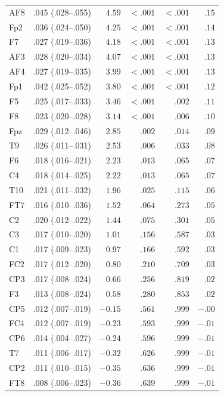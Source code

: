 {\begin{longtable}{llrrrr}
AF8 & .045 (.028--.055) & $4.59$ & $< .001$ & $< .001$ & $.15$ \\
Fp2 & .036 (.024--.050) & $4.25$ & $< .001$ & $< .001$ & $.14$ \\
F7 & .027 (.019--.036) & $4.18$ & $< .001$ & $< .001$ & $.13$ \\
AF3 & .028 (.020--.034) & $4.07$ & $< .001$ & $< .001$ & $.13$ \\
AF4 & .027 (.019--.035) & $3.99$ & $< .001$ & $< .001$ & $.13$ \\
Fp1 & .042 (.025--.052) & $3.80$ & $< .001$ & $< .001$ & $.12$ \\
F5 & .025 (.017--.033) & $3.46$ & $< .001$ & $.002$ & $.11$ \\
F8 & .023 (.020--.028) & $3.14$ & $< .001$ & $.006$ & $.10$ \\
Fpz & .029 (.012--.046) & $2.85$ & $.002$ & $.014$ & $.09$ \\
T9 & .026 (.011--.031) & $2.53$ & $.006$ & $.033$ & $.08$ \\
F6 & .018 (.016--.021) & $2.23$ & $.013$ & $.065$ & $.07$ \\
C4 & .018 (.014--.025) & $2.22$ & $.013$ & $.065$ & $.07$ \\
T10 & .021 (.011--.032) & $1.96$ & $.025$ & $.115$ & $.06$ \\
FT7 & .016 (.010--.036) & $1.52$ & $.064$ & $.273$ & $.05$ \\
C2 & .020 (.012--.022) & $1.44$ & $.075$ & $.301$ & $.05$ \\
C3 & .017 (.010--.020) & $1.01$ & $.156$ & $.587$ & $.03$ \\
C1 & .017 (.009--.023) & $0.97$ & $.166$ & $.592$ & $.03$ \\
FC2 & .017 (.012--.020) & $0.80$ & $.210$ & $.709$ & $.03$ \\
CP3 & .017 (.008--.024) & $0.66$ & $.256$ & $.819$ & $.02$ \\
F3 & .013 (.008--.024) & $0.58$ & $.280$ & $.853$ & $.02$ \\
CP5 & .012 (.007--.019) & $-0.15$ & $.561$ & $.999$ & $-.00$ \\
FC4 & .012 (.007--.019) & $-0.23$ & $.593$ & $.999$ & $-.01$ \\
CP6 & .014 (.004--.027) & $-0.24$ & $.596$ & $.999$ & $-.01$ \\
T7 & .011 (.006--.017) & $-0.32$ & $.626$ & $.999$ & $-.01$ \\
CP2 & .011 (.010--.015) & $-0.35$ & $.636$ & $.999$ & $-.01$ \\
FT8 & .008 (.006--.023) & $-0.36$ & $.639$ & $.999$ & $-.01$ \\

\end{longtable}}
